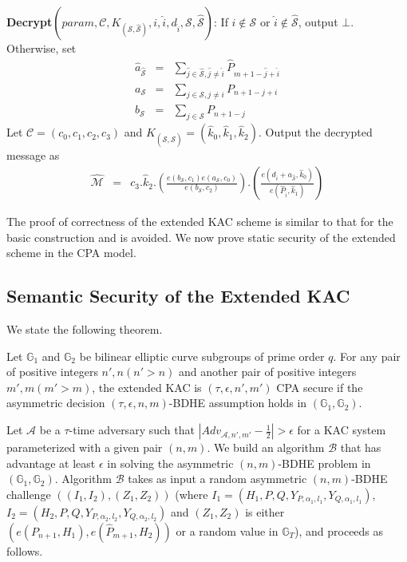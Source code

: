  \noindent\textbf{Decrypt}$(param,\mathcal{C},K_{\left(\mathcal{S},\hat{\mathcal{S}}\right)},i,\hat{i},d_{\hat{i}},\mathcal{S},\hat{\mathcal{S}})$: If $i\notin\mathcal{S}$ or $\hat{i}\notin\hat{\mathcal{S}}$, output $\bot$. Otherwise, set
 \begin{eqnarray} 
 \hat{a}_{\hat{\mathcal{S}}}&=&\sum_{\hat{j}\in\hat{\mathcal{S}},\hat{j}\neq \hat{i}}\hat{P}_{m+1-\hat{j}+\hat{i}}\nonumber\\
 a_{\mathcal{S}}&=&\sum_{j\in\mathcal{S},j\neq i}P_{n+1-j+i} \nonumber \\
 b_{\mathcal{S}}&=&\sum_{j\in\mathcal{S}}P_{n+1-j} \nonumber 
 \end{eqnarray} 
 \noindent Let $\mathcal{C}=(c_0,c_1,c_2,c_3)$ and $K_{\left(\mathcal{S},\hat{\mathcal{S}}\right)}=(\hat{k}_0,\hat{k}_1,\hat{k}_2)$. Output the decrypted message as  
\begin{eqnarray} 
\hat{\mathcal{M}}&=&c_3.\hat{k}_2.\left(\frac{e(b_{\mathcal{S}},c_1){e}(a_{\mathcal{S}},c_0)}{{e}(b_{\mathcal{S}},c_2)}\right).\left(\frac{e(d_{\hat{i}}+a_{\hat{\mathcal{S}}},\hat{k}_0)}{e(\hat{P}_{\hat{i}},\hat{k}_1)}\right) \nonumber
\end{eqnarray}

\noindent The proof of correctness of the extended KAC scheme is similar to that for the basic construction and is avoided. We now prove static security of the extended scheme in the CPA model.

\subsection{Semantic Security of the Extended KAC}
\label{subsec:proof_extended}

We state the following theorem.

\begin{Theorem}
\label{th:extendedCPA}
Let $\mathbb{G}_1$ and $\mathbb{G}_2$ be bilinear elliptic curve subgroups of prime order $q$. For any pair of positive integers $n',n (n'>n)$ and another pair of positive integers $m',m (m'>m)$, the extended KAC is $(\tau,\epsilon,n',m')$ CPA secure if the asymmetric decision $(\tau,\epsilon,n,m)$-BDHE assumption holds in $(\mathbb{G}_1,\mathbb{G}_2)$.
\end{Theorem}

 Let $\mathcal{A}$ be a $\tau$-time adversary such that $|Adv_{\mathcal{A},n',m'}-\frac{1}{2}| > \epsilon$ for a KAC system parameterized with a given pair $(n,m)$. We build an algorithm $\mathcal{B}$ that has advantage at least $\epsilon$ in solving the asymmetric $(n,m)$-BDHE problem in $(\mathbb{G}_1,\mathbb{G}_2)$. Algorithm $\mathcal{B}$ takes as input a random asymmetric $(n,m)$-BDHE challenge $((I_1,I_2),(Z_1,Z_2))$ (where $I_1=(H_1,P,Q,Y_{P,\alpha_1,l_1},Y_{Q,\alpha_1,l_1})$, $I_2=(H_2,P,Q,Y_{P,\alpha_2,l_2},Y_{Q,\alpha_2,l_2})$ and $(Z_1,Z_2)$ is either $\left({e}(P_{n+1},H_1),e(\hat{P}_{m+1},H_2)\right)$ or a random value in $\mathbb{G}_T$), and proceeds as follows.\\

